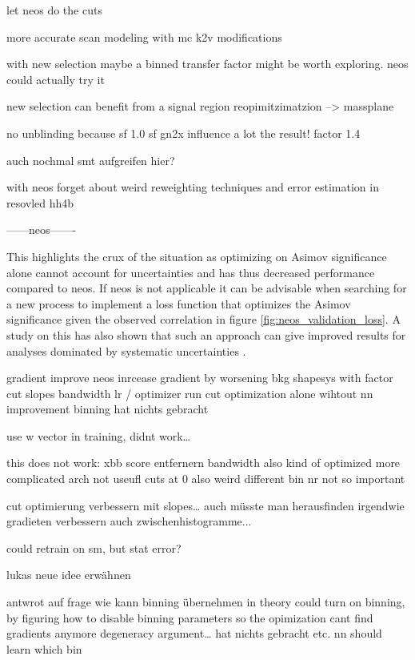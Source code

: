 let neos do the cuts 

more accurate scan modeling with mc k2v modifications 

with new selection maybe a binned transfer factor might be worth exploring.
neos could actually try it

new selection can benefit from a signal region reopimitzimatzion --> massplane


no unblinding because sf
1.0 sf gn2x influence a lot the result! factor 1.4 


auch nochmal smt aufgreifen hier?


with neos forget about weird reweighting techniques and error estimation in resovled hh4b


------neos-------


This highlights the crux of the situation as optimizing on Asimov significance alone cannot account for uncertainties and has thus decreased performance compared to \ac{neos}. If \ac{neos} is not applicable it can be advisable when searching for a new process to implement a loss function that optimizes the Asimov significance given the observed correlation in figure \ref{fig:neos_validation_loss}. A study on this has also shown that such an approach can give improved results for analyses dominated by systematic uncertainties \citep{elwood2018direct}.



gradient improve neos
inrcease gradient by worsening bkg shapesys with factor
cut slopes
bandwidth 
lr / optimizer
run cut optimization alone wihtout nn improvement
binning hat nichts gebracht

use w vector in training, didnt work…

this does not work:
xbb score entfernern
bandwidth also kind of optimized
more complicated arch not useufl
cuts at 0 also weird 
different bin nr not so important

cut optimierung verbessern mit slopes… 
auch müsste man herausfinden 
irgendwie gradieten verbessern auch zwischenhistogramme...

could retrain on sm, but stat error?

lukas neue idee erwähnen



antwrot auf frage wie kann binning übernehmen 
in theory could turn on binning, by figuring how to disable binning parameters so the opimization cant find gradients anymore 
degeneracy argument… hat nichts gebracht etc. nn should learn which bin


